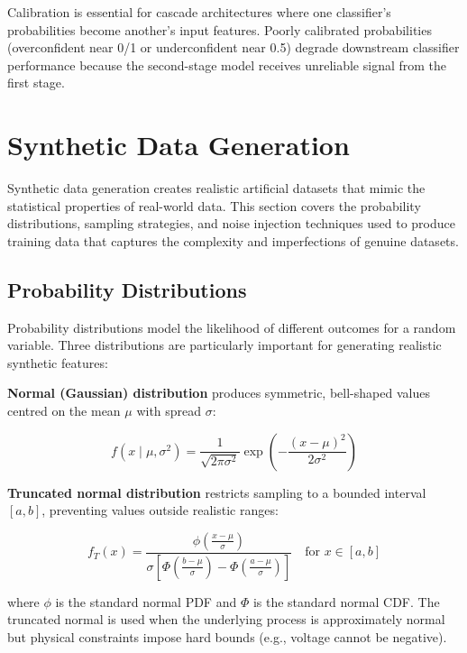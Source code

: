 \documentclass[10pt,a4paper]{article}
\begin{document}
Calibration is essential for cascade architectures where one classifier's probabilities become another's input features. Poorly calibrated probabilities (overconfident near 0/1 or underconfident near 0.5) degrade downstream classifier performance because the second-stage model receives unreliable signal from the first stage.

\section{Synthetic Data Generation}
\label{sec:synthetic-data}

Synthetic data generation creates realistic artificial datasets that mimic the statistical properties of real-world data. This section covers the probability distributions, sampling strategies, and noise injection techniques used to produce training data that captures the complexity and imperfections of genuine datasets.

\subsection{Probability Distributions}
\label{sec:probability-distributions}

Probability distributions model the likelihood of different outcomes for a random variable. Three distributions are particularly important for generating realistic synthetic features:

\textbf{Normal (Gaussian) distribution} produces symmetric, bell-shaped values centred on the mean $\mu$ with spread $\sigma$:

\begin{equation}
f(x \mid \mu, \sigma^2) = \frac{1}{\sqrt{2\pi\sigma^2}} \exp\left(-\frac{(x-\mu)^2}{2\sigma^2}\right)
\label{eq:normal}
\end{equation}

\textbf{Truncated normal distribution} restricts sampling to a bounded interval $[a, b]$, preventing values outside realistic ranges:

\begin{equation}
f_T(x) = \frac{\phi\left(\frac{x-\mu}{\sigma}\right)}{\sigma\left[\Phi\left(\frac{b-\mu}{\sigma}\right) - \Phi\left(\frac{a-\mu}{\sigma}\right)\right]} \quad \text{for } x \in [a, b]
\label{eq:truncated-normal}
\end{equation}

where $\phi$ is the standard normal PDF and $\Phi$ is the standard normal CDF. The truncated normal is used when the underlying process is approximately normal but physical constraints impose hard bounds (e.g., voltage cannot be negative).
\end{document}
